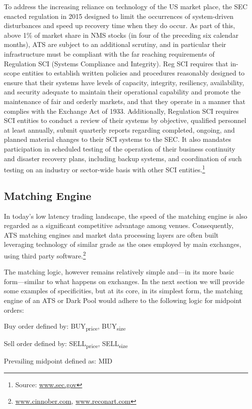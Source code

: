 To address the increasing reliance on technology of the US market place, the SEC enacted regulation in 2015 designed to limit the occurrences of system-driven disturbances and speed up recovery time when they do occur. As part of this, above 1\% of market share in NMS stocks (in four of the preceding six calendar months), ATS are subject to an additional scrutiny, and in particular their infrastructure must be compliant with the far reaching requirements of Regulation SCI (Systems Compliance and Integrity). Reg SCI requires that in-scope entities to establish written policies and procedures reasonably designed to ensure that their systems have levels of capacity, integrity, resiliency, availability, and security adequate to maintain their operational capability and promote the maintenance of fair and orderly markets, and that they operate in a manner that complies with the Exchange Act of 1933. Additionally, Regulation SCI requires SCI entities to conduct a review of their systems by objective, qualified personnel at least annually, submit quarterly reports regarding completed, ongoing, and planned material changes to their SCI systems to the SEC. It also mandates participation in scheduled testing of the operation of their business continuity and disaster recovery plans, including backup systems, and coordination of such testing on an industry or sector-wide basis with other SCI entities.\footnote{Source: \url{www.sec.gov}}


\subsection{Matching Engine}

In today's low latency trading landscape, the speed of the matching engine is also regarded as a significant competitive advantage among venues. Consequently, ATS  matching engines and market data processing layers are often built leveraging technology of similar grade as the ones employed by main exchanges, using third party software.\footnote{\url{www.cinnober.com}, \url{www.reconart.com}}


The matching logic, however remains relatively simple and---in its more basic form---similar to what happens on exchanges. In the next section we will provide some examples of specificities, but at its core, in its simplest form, the matching engine of an ATS or Dark Pool would adhere to the following logic for midpoint orders: \twomedskip


\noindent Buy order defined by: BUY\textsubscript{price}, BUY\textsubscript{size} \par
\noindent Sell order defined by: SELL\textsubscript{price}, SELL\textsubscript{size}  \par
\noindent Prevailing midpoint defined as: MID \twomedskip

